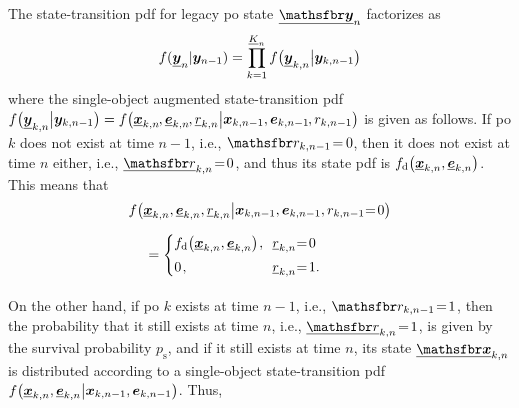 \documentclass[10pt, twoside, romanappendices]{IEEEtran}
\providecommand{\ist}{\hspace*{.3mm}}
\providecommand{\rmv}{\hspace*{-.3mm}}
\providecommand{\nn}{\nonumber}
\begin{document}
The \vspace{-.5mm} state-transition pdf for legacy \ac{po} state  $\underline{\RV{y}}_{n}$ factorizes as
\vspace{-.5mm}
\begin{equation}
f(\underline{\bm{y}}_{n}|\bm{y}_{n-1}) = \prod^{\underline{K}_{n}}_{k=1} f\big( \underline{\bm{y}}_{k,n} \big| \bm{y}_{k,n-1} \big)
\label{eq:stateTransitionU}
\end{equation}
where the single-object augmented state-transition pdf 
$f\big( \underline{\V{y}}_{k,n} \big| \V{y}_{k,n-1} \big) = f\big( \underline{\V{x}}_{k,n}\rmv, \underline{\V{e}}_{k,n}\rmv,  \underline{r}_{k,n} \big| \V{x}_{k,n-1}, \V{e}_{k,n-1}\rmv, r_{k,n-1}\big)$ is given as \vspace{.3mm} follows. 
If \ac{po} $k$ does not exist at time $n-1$, i.e., $\rv{r}_{k,n-1} \!=\rmv 0$, then it does not exist at time $n$ either, i.e., $\underline{\rv{r}}_{k,n} \!=\! 0$, and thus its state pdf is 
$f_{\mathrm{d}}\big( \underline{\bm{x}}_{k,n},  \underline{\bm{e}}_{k,n}\big)$.
This means \vspace{1.2mm} that 
\begin{align}
 &f\big( \underline{\V{x}}_{k,n},  \underline{\V{e}}_{k,n}, \underline{r}_{k,n} \big| \V{x}_{k,n-1}, \V{e}_{k,n-1}, r_{k,n-1} \!\rmv=\! 0 \big) \nn\\[2mm]
 &\hspace{4mm}= \begin{cases}
   f_{\mathrm{d}}\big( \underline{\V{x}}_{k,n},  \underline{\V{e}}_{k,n}\big) \ist, & \!\! \underline{r}_{k,n} \!\rmv=\! 0 \\[1mm]
   0 \ist, & \!\! \underline{r}_{k,n} \!\rmv=\! 1 . 
   \end{cases} \label{eq:singleTargetStateTrans_0} \\[-8.5mm]
   \nn\\
   \nn
\end{align}
On the other hand, if \ac{po} $k$ exists at time $n-1$, i.e., $\rv{r}_{k,n-1} \!=\! 1$, then the probability that it still exists at time $n$, i.e., $\underline{\rv{r}}_{k,n} \!=\! 1$, 
is given by the survival probability $p_{\mathrm{s}}$, and if it still exists at time $n$, its state $\underline{\RV{x}}_{k,n}$ is distributed according to a single-object
state-transition pdf $f\big( \underline{\bm{x}}_{k,n}, \underline{\bm{e}}_{k,n} \big| \bm{x}_{k,n-1}, \bm{e}_{k,n-1}\big)$. \vspace{1mm} Thus,
\end{document}
